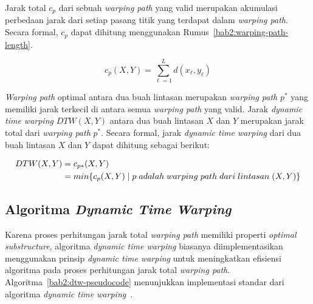 Jarak total $c_p$ dari sebuah \textit{warping path} yang valid merupakan akumulasi perbedaan jarak dari setiap pasang titik yang terdapat dalam \textit{warping path}. Secara formal, $c_p$ dapat dihitung menggunakan Rumus~\ref{bab2:warping-path-length}.

\begin{equation}
    c_p(X, Y) = \sum_{\ell = 1}^{L} d(x_\ell, y_\ell)
    \label{bab2:warping-path-length}
\end{equation}

\textit{Warping path} optimal antara dua buah lintasan merupakan \textit{warping path} $p^*$ yang memiliki jarak terkecil di antara semua \textit{warping path} yang valid. Jarak \textit{dynamic time warping} $DTW(X, Y)$ antara dua buah lintasan $X$ dan $Y$ merupakan jarak total dari \textit{warping path} $p^*$. Secara formal, jarak \textit{dynamic time warping} dari dua buah lintasan $X$ dan $Y$ dapat dihitung sebagai berikut:

\begin{align*}
    DTW(X, Y) & = c\textsubscript{$p*$}(X, Y) \\
    & = min\{c_p(X, Y)\;|\;p\;adalah\;warping\;path\;dari\;lintasan\;(X, Y)\}
\end{align*}

\subsection{Algoritma \textit{Dynamic Time Warping}}
\label{subsec:algoritma-dtw}

Karena proses perhitungan jarak total \textit{warping path} memiliki properti \textit{optimal substructure}, algoritma \textit{dynamic time warping} biasanya diimplementasikan menggunakan prinsip \textit{dynamic time warping} untuk meningkatkan efisiensi algoritma pada proses perhitungan jarak total \textit{warping path}. Algoritma~\ref{bab2:dtw-pseudocode} menunjukkan implementasi standar dari algoritma \textit{dynamic time warping}~\cite{senin:02:dtw}.

